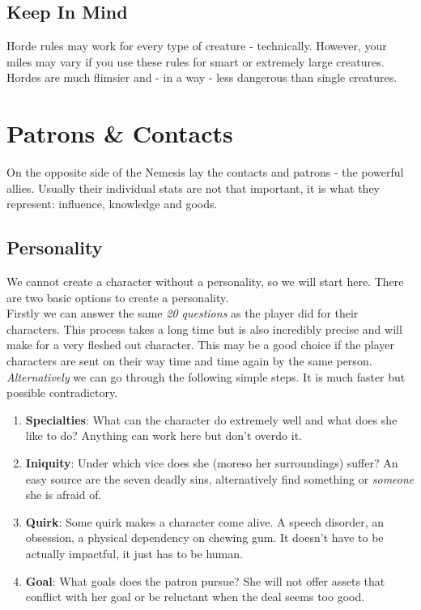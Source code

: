 \documentclass[12pt,a4paper,openany]{book}
\begin{document}
	\section*{Keep In Mind}
	Horde rules may work for every type of creature - technically. However, your miles may vary if you use these rules for smart or extremely large creatures. Hordes are much flimsier and - in a way - less dangerous than single creatures.

	\chapter{Patrons \& Contacts}
	On the opposite side of the Nemesis lay the contacts and patrons - the powerful allies. Usually their individual stats are not that important, it is what they represent: influence, knowledge and goods.
	\section*{Personality}
	We cannot create a character without a personality, so we will start here. There are two basic options to create a personality.\\
	Firstly we can answer the same \emph{20 questions} as the player did for their characters. This process takes a long time but is also incredibly precise and will make for a very fleshed out character. This may be a good choice if the player characters are sent on their way time and time again by the same person.
	\emph{Alternatively} we can go through the following simple steps. It is much faster but possible contradictory.
	\begin{enumerate}
		\setlength\itemsep{-8mm} \vspace{-8mm}
		\item \textbf{Specialties}: What can the character do extremely well and what does she like to do? Anything can work here but don't overdo it.
		\item \textbf{Iniquity}: Under which vice does she (moreso her surroundings) suffer? An easy source are the seven deadly sins, alternatively find something or \emph{someone} she is afraid of.
		\item \textbf{Quirk}: Some quirk makes a character come alive. A speech disorder, an obsession, a physical dependency on chewing gum. It doesn't have to be actually impactful, it just has to be human.
		\item \textbf{Goal}: What goals does the patron pursue? She will not offer assets that conflict with her goal or be reluctant when the deal seems too good.
	\end{enumerate}
\end{document}
